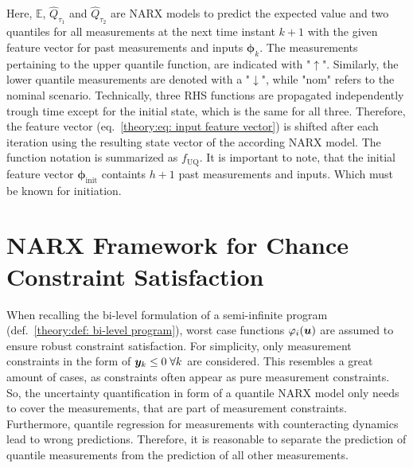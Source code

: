 \noindent
Here, $\mathbb{E}$, $\hat{Q}_{\tau_1}$ and $\hat{Q}_{\tau_2}$ are NARX models to predict the expected value and two
quantiles for all measurements at the next time instant $k+1$ with the given feature vector for past measurements
and inputs $\bm{\phi}_k$. The measurements pertaining to the upper quantile function, are indicated
with "$\uparrow$". Similarly, the lower quantile measurements are denoted with a "$\downarrow$", while
"nom" refers to the nominal scenario. Technically, three RHS functions are propagated
independently trough time except for the initial state, which is the same for all three.
Therefore, the feature vector
(eq.~\ref{theory:eq: input feature vector}) is shifted after each iteration using the resulting
state vector of the according NARX model. The function notation is summarized as $f_\text{UQ}$.
It is important to note, that the initial feature vector $\bm{\phi}_\text{init}$ containts $h+1$
past measurements and inputs. Which must be known for initiation.
\newline

\section{NARX Framework for Chance Constraint Satisfaction}

When recalling the bi-level formulation of a semi-infinite program (def.~\ref{theory:def: bi-level program}),
worst case functions $\varphi_i({\bm{u}})$ are assumed to ensure robust constraint satisfaction.
For simplicity, only measurement constraints in the 
form of ${\bm{y}}_k \leq 0 \; \forall k$ are considered. This resembles a great amount of cases, as constraints
often appear as pure measurement constraints.  So, the uncertainty quantification in form of 
a quantile NARX model only needs to cover the measurements, that are part of measurement constraints.
Furthermore, quantile regression for measurements with counteracting dynamics lead to wrong predictions.
Therefore, it is reasonable to separate the prediction of quantile measurements from the prediction of all other measurements.


